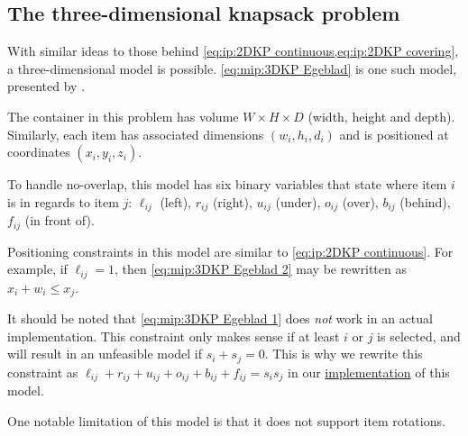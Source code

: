 \subsection{The three-dimensional knapsack problem}

With similar ideas to those behind \cref{eq:ip:2DKP continuous,eq:ip:2DKP covering}, a three-dimensional model is possible. \cref{eq:mip:3DKP Egeblad} is one such model, presented by \textcite{EGEBLAD2009}.

The container in this problem has volume $W \times H \times D$ (width, height and depth). Similarly, each item has associated dimensions $(w_i,h_i,d_i)$ and is positioned at coordinates $(x_i,y_i,z_i)$.

To handle no-overlap, this model has six binary variables that state where item $i$ is in regards to item $j$: $\ell_{ij}$ (left), $r_{ij}$ (right), $u_{ij}$ (under), $o_{ij}$ (over), $b_{ij}$ (behind), $f_{ij}$ (in front of).

Positioning constraints in this model are similar to \cref{eq:ip:2DKP continuous}. For example, if $\ell_{ij} = 1$, then \cref{eq:mip:3DKP Egeblad 2} may be rewritten as $x_i + w_i \leq x_j$.

It should be noted that \cref{eq:mip:3DKP Egeblad 1} does \emph{not} work in an actual implementation. This constraint only makes sense if at least $i$ or $j$ is selected, and will result in an unfeasible model if $s_i + s_j = 0$. This is why we rewrite this constraint as $\ell_{ij} + r_{ij} + u_{ij} + o_{ij} + b_{ij} + f_{ij} = s_i s_j$ in our \href{https://github.com/phcentenaro7/IC-Knapsack/blob/5a6cb381dc20d3dbfcf1a31c8181aadd1a6c9988/Knapsack/Egeblad/knapsack_model.jl#L47}{implementation} of this model.

One notable limitation of this model is that it does not support item rotations.

